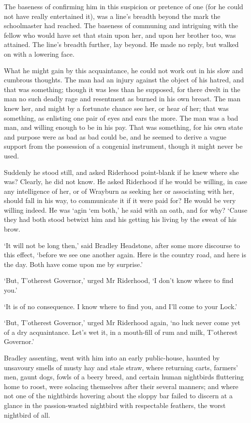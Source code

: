 The baseness of confirming him in this suspicion or pretence of one (for
he could not have really entertained it), was a line’s breadth beyond
the mark the schoolmaster had reached. The baseness of communing and
intriguing with the fellow who would have set that stain upon her, and
upon her brother too, was attained. The line’s breadth further, lay
beyond. He made no reply, but walked on with a lowering face.

What he might gain by this acquaintance, he could not work out in his
slow and cumbrous thoughts. The man had an injury against the object of
his hatred, and that was something; though it was less than he supposed,
for there dwelt in the man no such deadly rage and resentment as burned
in his own breast. The man knew her, and might by a fortunate chance see
her, or hear of her; that was something, as enlisting one pair of eyes
and ears the more. The man was a bad man, and willing enough to be in
his pay. That was something, for his own state and purpose were as
bad as bad could be, and he seemed to derive a vague support from the
possession of a congenial instrument, though it might never be used.

Suddenly he stood still, and asked Riderhood point-blank if he knew
where she was? Clearly, he did not know. He asked Riderhood if he would
be willing, in case any intelligence of her, or of Wrayburn as seeking
her or associating with her, should fall in his way, to communicate it
if it were paid for? He would be very willing indeed. He was ‘agin ‘em
both,’ he said with an oath, and for why? ‘Cause they had both stood
betwixt him and his getting his living by the sweat of his brow.

‘It will not be long then,’ said Bradley Headstone, after some more
discourse to this effect, ‘before we see one another again. Here is the
country road, and here is the day. Both have come upon me by surprise.’

‘But, T’otherest Governor,’ urged Mr Riderhood, ‘I don’t know where to
find you.’

‘It is of no consequence. I know where to find you, and I’ll come to
your Lock.’

‘But, T’otherest Governor,’ urged Mr Riderhood again, ‘no luck never
come yet of a dry acquaintance. Let’s wet it, in a mouth-fill of rum and
milk, T’otherest Governor.’

Bradley assenting, went with him into an early public-house, haunted by
unsavoury smells of musty hay and stale straw, where returning carts,
farmers’ men, gaunt dogs, fowls of a beery breed, and certain human
nightbirds fluttering home to roost, were solacing themselves after
their several manners; and where not one of the nightbirds hovering
about the sloppy bar failed to discern at a glance in the passion-wasted
nightbird with respectable feathers, the worst nightbird of all.

